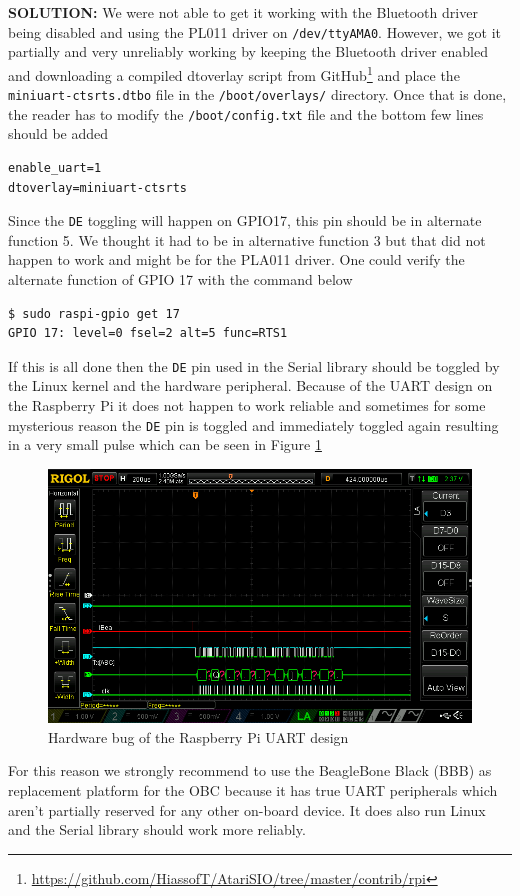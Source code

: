 \textbf{SOLUTION:} We were not able to get it working with the Bluetooth driver being disabled and using the PL011 driver on \texttt{/dev/ttyAMA0}. However, we got it partially and very unreliably working by keeping the Bluetooth driver enabled and downloading a compiled dtoverlay script from GitHub\footnote{\url{https://github.com/HiassofT/AtariSIO/tree/master/contrib/rpi}} and place the \texttt{miniuart-ctsrts.dtbo} file in the \texttt{/boot/overlays/} directory.
Once that is done, the reader has to modify the \texttt{/boot/config.txt} file and the bottom few lines should be added

\begin{lstlisting}[caption={If UART is not enabled then add the first line as well in \texttt{/boot/config.txt}}, captionpos=b, label={lst:rpi_fix1}, basicstyle=\small, style=dos]
enable_uart=1
dtoverlay=miniuart-ctsrts
\end{lstlisting}

Since the \texttt{DE} toggling will happen on GPIO17, this pin should be in alternate function 5. We thought it had to be in alternative function 3 but that did not happen to work and might be for the PLA011 driver.
One could verify the alternate function of GPIO 17 with the command below

\begin{lstlisting}[caption={If UART is not enabled then add the first line as well in \texttt{/boot/config.txt}}, captionpos=b, label={lst:rpi_fix1}, basicstyle=\small, style=dos]
$ sudo raspi-gpio get 17
GPIO 17: level=0 fsel=2 alt=5 func=RTS1
\end{lstlisting}

If this is all done then the \texttt{DE} pin used in the Serial library should be toggled by the Linux kernel and the hardware peripheral.
Because of the UART design on the Raspberry Pi it does not happen to work reliable and sometimes for some mysterious reason the \texttt{DE} pin is toggled and immediately toggled again resulting in a very small pulse which can be seen in Figure \ref{fig:RPi_Uart_Bug}


\begin{figure}[H]
    \includegraphics[scale=0.4]{figures/RPi_Uart_Bug.png}
    \caption{Hardware bug of the Raspberry Pi UART design}
    \label{fig:RPi_Uart_Bug}
\end{figure}

For this reason we strongly recommend to use the BeagleBone Black (BBB) as replacement platform for the OBC because it has true UART peripherals which aren't partially reserved for any other on-board device.
It does also run Linux and the Serial library should work more reliably.
